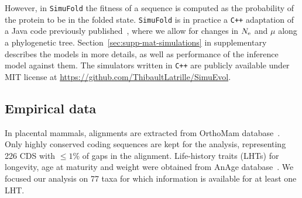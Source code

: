 However, in \texttt{SimuFold} the fitness of a sequence is computed as the probability of the protein to be in the folded state.
\texttt{SimuFold} is in practice a \texttt{C++} adaptation of a Java code previously published~\citep{Goldstein2016, Goldstein2017}, where we allow for changes in $N_{\text{e}}$ and $\mu$ along a phylogenetic tree.
Section~\ref{sec:supp-mat-simulations} in supplementary describes the models in more details, as well as performance of the inference model against them.
The simulators written in \texttt{C++} are publicly available under MIT license at \url{https://github.com/ThibaultLatrille/SimuEvol}.

\subsection{Empirical data}
In placental mammals, alignments are extracted from OrthoMam database~\citep{Ranwez2007,Scornavacca2019}.
Only highly conserved coding sequences are kept for the analysis, representing 226 \acrshort{CDS} with $\leq 1\%$ of gaps in the alignment.
Life-history traits (\acrshort{LHT}s) for longevity, age at maturity and weight were obtained from AnAge database~\citep{DEMAGALHAES2009,Tacutu2012}.
We focused our analysis on 77 taxa for which information is available for at least one \acrshort{LHT}.
